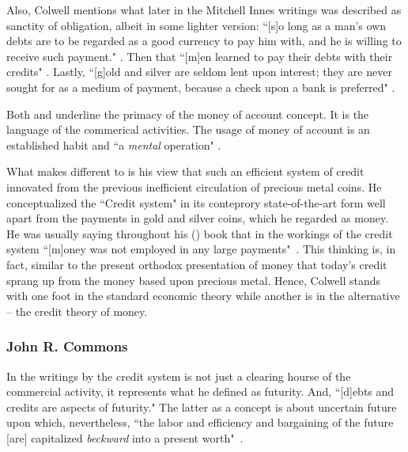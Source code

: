 Also, Colwell mentions what later in the Mitchell Innes writings  was described as sanctity of obligation, albeit in some lighter version: ``[s]o long as a man's own debts are to be regarded as a good currency to pay him with, and he is willing to receive such payment." \citeyearpar[p.~691]{colwell1860}. Then that ``[m]en learned to pay their debts with their credits" \citeyearpar[p.~691]{colwell1860}. Lastly, ``[g]old and silver are seldom lent upon interest; they are never sought for as a medium of payment, because a check upon a bank is preferred" \citeyearpar[p.~694]{colwell1860}. 

Both \citeauthor{colwell1859} and \citeauthor{innes1913} underline the primacy of the money of account concept. It is the language of the commerical activities. The usage of money of account is an established habit and ``a \textit{mental} operation" \citep[p.~3, emphasis added]{colwell1859}. 

What makes \citeauthor{colwell1859} different to \citeauthor{innes1913} is his view that such an efficient system of credit innovated from the previous inefficient circulation of precious metal coins. He conceptualized the ``Credit system" in its conteprory state-of-the-art form well apart from the payments in gold and silver coins, which he regarded as money. He was usually saying throughout his (\citeyear{colwell1859}) book that in the workings of the credit system ``[m]oney was not employed in any large payments"~\citep[p.~190]{colwell1859}.   This thinking is, in fact, similar to the present orthodox presentation of money that today's credit sprang up from the money based upon precious metal. Hence, Colwell stands with one foot in the standard economic theory while another is in the alternative -- the credit theory of money. 

%
%
\subsubsection{John R. Commons}

In the writings by \citeauthor{commons1951} the credit system is not just a clearing hourse of the commercial activity, it represents what he defined as futurity. And, ``[d]ebts and credits are aspects of futurity." The latter as a concept is about uncertain future upon which, nevertheless, ``the labor and efficiency and bargaining of the future [are] capitalized \textit{beckward} into a present worth"~\citep[p.~103,105]{commons1951}.

